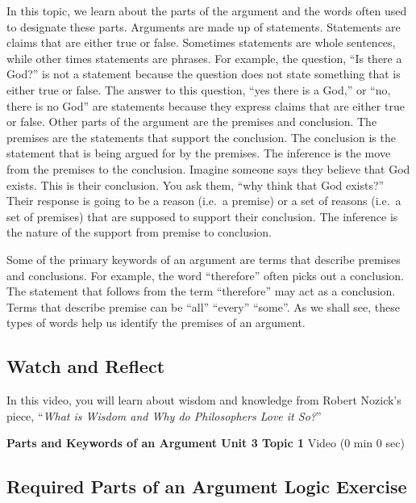 \documentclass[
]{book}
\begin{document}
In this topic, we learn about the parts of the argument and the words often used to designate these parts. Arguments are made up of statements. Statements are claims that are either true or false. Sometimes statements are whole sentences, while other times statements are phrases. For example, the question, ``Is there a God?'' is not a statement because the question does not state something that is either true or false. The answer to this question, ``yes there is a God,'' or ``no, there is no God'' are statements because they express claims that are either true or false. Other parts of the argument are the premises and conclusion. The premises are the statements that support the conclusion. The conclusion is the statement that is being argued for by the premises. The inference is the move from the premises to the conclusion. Imagine someone says they believe that God exists. This is their conclusion. You ask them, ``why think that God exists?'' Their response is going to be a reason (i.e.~a premise) or a set of reasons (i.e.~a set of premises) that are supposed to support their conclusion. The inference is the nature of the support from premise to conclusion.

Some of the primary keywords of an argument are terms that describe premises and conclusions. For example, the word ``therefore'' often picks out a conclusion. The statement that follows from the term ``therefore'' may act as a conclusion. Terms that describe premise can be ``all'' ``every'' ``some''. As we shall see, these types of words help us identify the premises of an argument.

\hypertarget{watch-and-reflect-16}{%
\subsection*{Watch and Reflect}\label{watch-and-reflect-16}}

In this video, you will learn about wisdom and knowledge from Robert Nozick's piece, ``\emph{What is Wisdom and Why do Philosophers Love it So?}''

\textbf{Parts and Keywords of an Argument Unit 3 Topic 1} Video (0 min 0 sec)

\hypertarget{required-parts-of-an-argument-logic-exercise}{%
\subsection*{Required Parts of an Argument Logic Exercise}\label{required-parts-of-an-argument-logic-exercise}}
\end{document}
